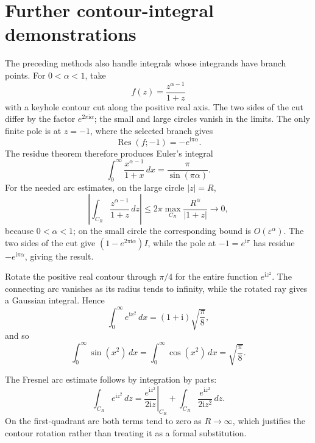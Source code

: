 \section{Further contour-integral demonstrations}

The preceding methods also handle integrals whose integrands have branch points. For $0<\alpha<1$, take
\begin{equation}
f(z)=\frac{z^{\alpha-1}}{1+z}
\end{equation}
with a keyhole contour cut along the positive real axis. The two sides of the cut differ by the factor $e^{2\pi\mathrm{i}\alpha}$; the small and large circles vanish in the limits. The only finite pole is at $z=-1$, where the selected branch gives
\begin{equation}
\operatorname{Res}(f;-1)=-e^{\mathrm{i}\pi\alpha}.
\end{equation}
The residue theorem therefore produces Euler's integral
\begin{equation}
\int_0^\infty\frac{x^{\alpha-1}}{1+x}\,dx=\frac{\pi}{\sin(\pi\alpha)}.
\end{equation}
For the needed arc estimates, on the large circle $|z|=R$,
\begin{equation}
\left|\int_{C_R}\frac{z^{\alpha-1}}{1+z}\,dz\right|
\leq2\pi\max_{C_R}\frac{R^\alpha}{|1+z|}\longrightarrow0,
\end{equation}
because $0<\alpha<1$; on the small circle the corresponding bound is $O(\varepsilon^\alpha)$. The two sides of the cut give $(1-e^{2\pi\mathrm{i}\alpha})I$, while the pole at $-1=e^{\mathrm{i}\pi}$ has residue $-e^{\mathrm{i}\pi\alpha}$, giving the result.

\begin{example}
Rotate the positive real contour through $\pi/4$ for the entire function $e^{\mathrm{i}z^2}$. The connecting arc vanishes as its radius tends to infinity, while the rotated ray gives a Gaussian integral. Hence
\begin{equation}
\int_0^\infty e^{\mathrm{i}x^2}\,dx=(1+\mathrm{i})\sqrt{\frac{\pi}{8}},
\end{equation}
and so
\begin{equation}
\int_0^\infty\sin(x^2)\,dx=\int_0^\infty\cos(x^2)\,dx=\sqrt{\frac{\pi}{8}}.
\end{equation}
\end{example}

The Fresnel arc estimate follows by integration by parts:
\begin{equation}
\int_{C_R}e^{\mathrm{i}z^2}\,dz=
\left.\frac{e^{\mathrm{i}z^2}}{2\mathrm{i}z}\right|_{C_R}
+\int_{C_R}\frac{e^{\mathrm{i}z^2}}{2\mathrm{i}z^2}\,dz.
\end{equation}
On the first-quadrant arc both terms tend to zero as $R\to\infty$, which justifies the contour rotation rather than treating it as a formal substitution.

